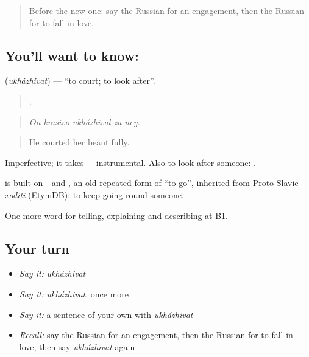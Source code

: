 \label{lesson:RU-C306-ukhazhivat}



\begin{quote}
Before the new one: say the Russian for an engagement, then the Russian for to fall in love.
\end{quote}

\subsection*{You'll want to know: }
\textbf{} (\emph{ukházhivat}) — \textquotedblleft{}to court; to look after\textquotedblright{}.

\begin{quote}
    .
\end{quote}

\begin{quote}
\emph{On krasívo ukházhival za ney.}
\end{quote}

\begin{quote}
He courted her beautifully.
\end{quote}

Imperfective; it takes \emph{} + instrumental. Also to look after someone: \emph{  }.

\begin{cousinweb}
\emph{} is built on \emph{-} and \emph{}, an old repeated form of \emph{} \textquotedblleft{}to go\textquotedblright{}, inherited from Proto-Slavic \emph{xoditi} (EtymDB): to keep going round someone.
\end{cousinweb}

\begin{grammarlens}[title={What you've built}]
One more word for telling, explaining and describing at B1.
\end{grammarlens}

\subsection*{Your turn}
\begin{itemize}
\raggedright
  \item \emph{Say it:} \emph{ukházhivat}
  \item \emph{Say it:} \emph{ukházhivat}, once more
  \item \emph{Say it:} a sentence of your own with \emph{ukházhivat}
  \item \emph{Recall:} say the Russian for an engagement, then the Russian for to fall in love, then say \emph{ukházhivat} again
\end{itemize}

